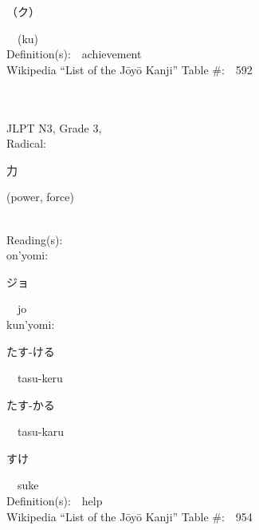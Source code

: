 \begin{multicols}{2}
{\hspace*{2em}}{\begin{CJK}{UTF8}{min} （ク） \end{CJK}}\ \ (ku)\ \ \\
Definition(s):\ \ achievement \\
Wikipedia ``List of the J\=oy\=o Kanji'' Table \#:\ \ 592 \\
\ \ \\
{\fontsize{34pt}{40pt}  }\ \ \\  %
{JLPT N3, Grade 3, \\Radical:\ \ {\begin{CJK}{UTF8}{min} 力 \end{CJK}} (power, force) } \\
Reading(s):\ \ \\
{\hspace*{1em}}on'yomi:\ \ \\
{\hspace*{2em}}{\begin{CJK}{UTF8}{min} ジョ \end{CJK}}\ \ jo\ \ \\
{\hspace*{1em}}kun'yomi:\ \ \\
{\hspace*{2em}}{\begin{CJK}{UTF8}{min} たす-ける \end{CJK}}\ \ tasu-keru\ \ \\
{\hspace*{2em}}{\begin{CJK}{UTF8}{min} たす-かる \end{CJK}}\ \ tasu-karu\ \ \\
{\hspace*{2em}}{\begin{CJK}{UTF8}{min} すけ \end{CJK}}\ \ suke\ \ \\
Definition(s):\ \ help \\
Wikipedia ``List of the J\=oy\=o Kanji'' Table \#:\ \ 954 \\
\ \ \\
{\fontsize{34pt}{40pt}  }\ \ \\  %

\end{multicols}
